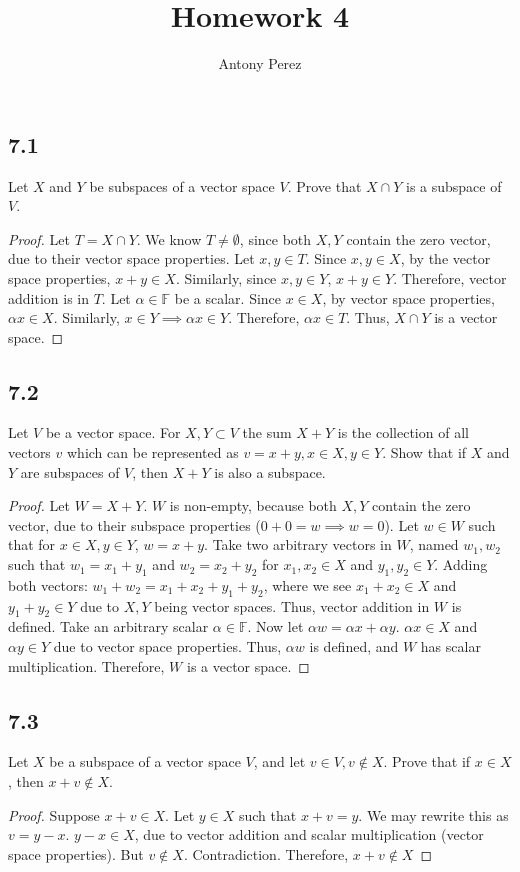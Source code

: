 \documentclass{amsart}
\title{Homework 4}
\author{Antony Perez}
\begin{document}
\maketitle
\subsection*{7.1} Let $X$ and $Y$ be subspaces of a vector space $V$. Prove that $X \cap Y$ is a subspace of $V$. 
\begin{proof}
    Let $T = X \cap Y$. We know $T \neq \emptyset$, since both $X,Y$ contain the zero vector, due to their vector space properties. Let $x,y \in T$. Since $x,y \in X$, by the vector space properties, $x+y \in X$. Similarly, since $x,y \in Y$, $x+y \in Y$. Therefore, vector addition is in $T$. Let $\alpha \in \mathbb{F}$ be a scalar. Since $x \in X$, by vector space properties, $\alpha x \in X$. Similarly, $x \in Y \implies \alpha x \in Y$. Therefore, $\alpha x \in T$. Thus, $X \cap Y$ is a vector space.  
\end{proof}
\subsection*{7.2} Let $V$ be a vector space. For $X,Y \subset V$ the sum $X+Y$ is the collection of all vectors $v$ which can be represented as $v = x+y, x\in X, y \in Y$. Show that if $X$ and $Y$ are subspaces of $V$, then $X+Y$ is also a subspace. 
\begin{proof}
    Let $W = X+Y$. $W$ is non-empty, because both $X,Y$ contain the zero vector, due to their subspace properties ($0 + 0 = w \implies w = 0$). Let $w \in W$ such that for $x \in X, y \in Y$, $w = x + y$. Take two arbitrary vectors in $W$, named $w_1,w_2$ such that $w_1 = x_1 + y_1$ and $w_2 = x_2 + y_2$ for $x_1,x_2 \in X$ and $y_1, y_2 \in Y$. Adding both vectors: $w_1 + w_2 = x_1 + x_2 + y_1 + y_2$, where we see $x_1 + x_2 \in X$ and $y_1 + y_2 \in Y$ due to $X,Y$ being vector spaces. Thus, vector addition in $W$ is defined. Take an arbitrary scalar $\alpha \in \mathbb{F}$. Now let $\alpha w = \alpha x + \alpha y$. $\alpha x \in X$ and $\alpha y \in Y$ due to vector space properties. Thus, $\alpha w$ is defined, and $W$ has scalar multiplication. Therefore, $W$ is a vector space. 
\end{proof}
\subsection*{7.3} Let $X$ be a subspace of a vector space $V$, and let $v \in V, v \not \in X$. Prove that if $x \in X$, then $x+v \not \in X$.
\begin{proof}
    Suppose $x+v \in X$. Let $y \in X$ such that $x+v = y$. We may rewrite this as $v = y-x$. $y-x \in X$, due to vector addition and scalar multiplication (vector space properties). But $v \not \in X$. Contradiction. Therefore, $x+v \not \in X$
\end{proof}
\end{document}

